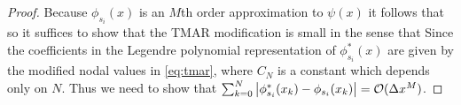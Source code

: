 \documentclass{ametsoc}
\begin{document}
\tmarAcc*
\begin{proof}
Because $\phi_{s_i}(x)$ is an $M$th order approximation to $\psi(x)$ it follows that
so it suffices to show that the TMAR modification is small in the sense that
Since the coefficients in the Legendre polynomial representation of $\phi^*_{s_i}(x)$ are given by the modified nodal values in \eqref{eq:tmar},
where $C_N$ is a constant which depends only on $N$. Thus we need to show that $\sum_{k=0}^N \left| \phi^*_{s_i}(x_k) - \phi_{s_i}(x_k) \right| = \mathcal{O}(\Delta x^{M})$. 


\end{proof}
\end{document}

